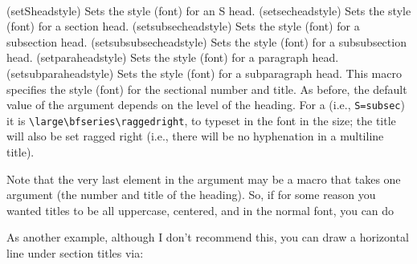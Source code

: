 \begin{syntax}
\cmd{\setSheadstyle} \\
\end{syntax}
\glossary(setSheadstyle)%
  {}%
  {Sets the style (font) for an S head.}
\glossary(setsecheadstyle)%
  {}%
  {Sets the style (font) for a section head.}
\glossary(setsubsecheadstyle)%
  {}%
  {Sets the style (font) for a subsection head.}
\glossary(setsubsubsecheadstyle)%
  {}%
  {Sets the style (font) for a subsubsection head.}
\glossary(setparaheadstyle)%
  {}%
  {Sets the style (font) for a paragraph head.}
\glossary(setsubparaheadstyle)%
  {}%
  {Sets the style (font) for a subparagraph head.}
This macro specifies the style (font) for the sectional number and title.
As before, the default value of the  argument depends on the
level of the heading. For a \cmd{\subsection} (i.e., \verb?S=subsec?) it is
\verb?\large\bfseries\raggedright?, to typeset in the \cmd{\bfseries} font
in the \cmd{\large} size; the title will also be set ragged right (i.e.,
there will be no hyphenation in a multiline title).

    Note that the very last element in the  argument may be a
macro that takes one argument (the number and title of the heading). So,
if for some reason you wanted \cmd{\subsubsection} titles to be all uppercase,
centered, and in the normal font, you can do
\begin{lcode}
\setsubsubsecheadstyle{\normalfont\centering\MakeUppercase}
\end{lcode}

    As another example, although I don't recommend this, you can draw a
horizontal line under section titles via:
\begin{lcode}
\newcommand{\ruledsec}[1]{%
  \Large\bfseries\raggedright #1 \rule{\textwidth}{0.4pt}}
\end{lcode}


